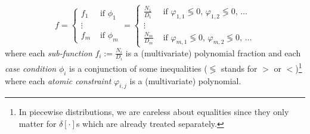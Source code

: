 \documentclass{article}
\newcommand{\case}[2]{#2 &\text{ if } #1}%
\begin{document}
\begin{equation}
\label{e:ppf}
f = 
  \begin{cases}
  \case{\phi_1}{f_1}\\
\vdots\\
  \case{\phi_m}{f_m}    
  \end{cases}
\!\!\!=
  \begin{cases}
  \case{\varphi_{1,1} \lessgtr 0,\, \varphi_{1,2} \lessgtr 0,\, \ldots}{\frac{N_1}{D_1}} \\
\vdots\\
   \case{\varphi_{m,1} \lessgtr 0,\, \varphi_{m,2} \lessgtr 0,\, \ldots}{\frac{N_m}{D_m}}    
  \end{cases}
\end{equation}
where each \emph{sub-function} $f_i := \frac{N_i}{D_i}$ is a (multivariate) polynomial fraction and 
each \emph{case condition} $\phi_i$ is a conjunction of some inequalities ($\lessgtr$ stands for  
$>$ or $<$)\footnote{In piecewise distributions,  
we are careless about equalities since they only matter for $\delta[\cdot]$s which are already treated separately.} 
where each \emph{atomic constraint} $\varphi_{i,j}$ is a (multivariate) polynomial.

\end{document}
